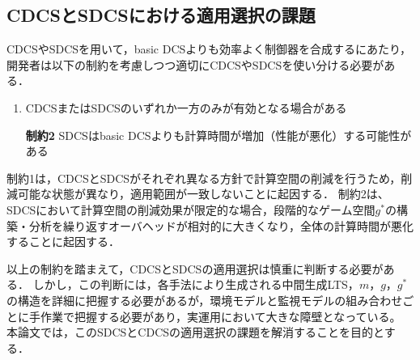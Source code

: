 
\subsection{CDCSとSDCSにおける適用選択の課題}
\label{subsection:limitation}
CDCSやSDCSを用いて，basic DCSよりも効率よく制御器を合成するにあたり，開発者は以下の制約を考慮しつつ適切にCDCSやSDCSを使い分ける必要がある\cite{yamauchi:IPSJ2024}．

\begin{enumerate}[\bf 制約1]
\item CDCSまたはSDCSのいずれか一方のみが有効となる場合がある
\item[\bf 制約2]  SDCSはbasic DCSよりも計算時間が増加（性能が悪化）する可能性がある
\end{enumerate}

制約1は，CDCSとSDCSがそれぞれ異なる方針で計算空間の削減を行うため，削減可能な状態が異なり，適用範囲が一致しないことに起因する．
制約2は、SDCSにおいて計算空間の削減効果が限定的な場合，段階的なゲーム空間$g^{*}$の構築・分析を繰り返すオーバヘッドが相対的に大きくなり，全体の計算時間が悪化することに起因する．

以上の制約を踏まえて，CDCSとSDCSの適用選択は慎重に判断する必要がある．
しかし，この判断には，各手法により生成される中間生成LTS，$m$，$g$，$g^{*}$の構造を詳細に把握する必要があるが，環境モデルと監視モデルの組み合わせごとに手作業で把握する必要があり，実運用において大きな障壁となっている。
本論文では，このSDCSとCDCSの適用選択の課題を解消することを目的とする．

